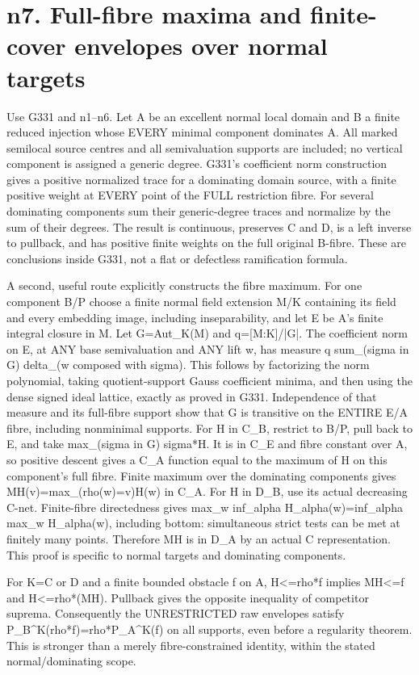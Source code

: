 \documentclass[11pt]{article}
\begin{document}
\section{n7. Full-fibre maxima and finite-cover envelopes over normal targets}

Use G331 and n1--n6. Let A be an excellent normal local domain and B a finite reduced injection whose EVERY minimal component dominates A. All marked semilocal source centres and all semivaluation supports are included; no vertical component is assigned a generic degree. G331's coefficient norm construction gives a positive normalized trace for a dominating domain source, with a finite positive weight at EVERY point of the FULL restriction fibre. For several dominating components sum their generic-degree traces and normalize by the sum of their degrees. The result is continuous, preserves C and D, is a left inverse to pullback, and has positive finite weights on the full original B-fibre. These are conclusions inside G331, not a flat or defectless ramification formula.

A second, useful route explicitly constructs the fibre maximum. For one component B/P choose a finite normal field extension M/K containing its field and every embedding image, including inseparability, and let E be A's finite integral closure in M. Let G=Aut\_K(M) and q=[M:K]/|G|. The coefficient norm on E, at ANY base semivaluation and ANY lift w, has measure q sum\_(sigma in G) delta\_(w composed with sigma). This follows by factorizing the norm polynomial, taking quotient-support Gauss coefficient minima, and then using the dense signed ideal lattice, exactly as proved in G331. Independence of that measure and its full-fibre support show that G is transitive on the ENTIRE E/A fibre, including nonminimal supports. For H in C\_B, restrict to B/P, pull back to E, and take max\_(sigma in G) sigma*H. It is in C\_E and fibre constant over A, so positive descent gives a C\_A function equal to the maximum of H on this component's full fibre. Finite maximum over the dominating components gives MH(v)=max\_(rho(w)=v)H(w) in C\_A. For H in D\_B, use its actual decreasing C-net. Finite-fibre directedness gives max\_w inf\_alpha H\_alpha(w)=inf\_alpha max\_w H\_alpha(w), including bottom: simultaneous strict tests can be met at finitely many points. Therefore MH is in D\_A by an actual C representation. This proof is specific to normal targets and dominating components.

For K=C or D and a finite bounded obstacle f on A, H<=rho*f implies MH<=f and H<=rho*(MH). Pullback gives the opposite inequality of competitor suprema. Consequently the UNRESTRICTED raw envelopes satisfy P\_B\textasciicircum{}K(rho*f)=rho*P\_A\textasciicircum{}K(f) on all supports, even before a regularity theorem. This is stronger than a merely fibre-constrained identity, within the stated normal/dominating scope.
\end{document}
